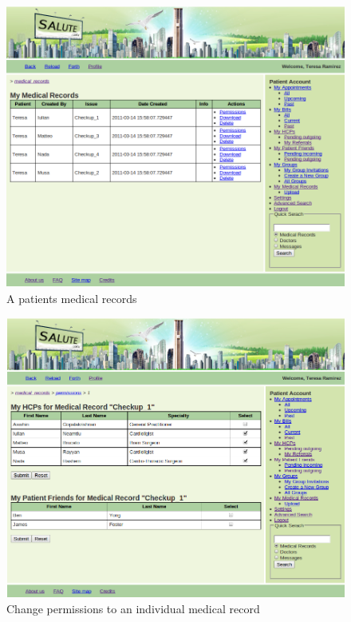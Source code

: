 \begin{figure}
\includegraphics[scale=0.5]{screenshots/my_medical_records.png}
\caption{A patients medical records}
\end{figure}

\begin{figure}
\includegraphics[scale=0.5]{screenshots/change_permissions_to_medical_rec.png}
\caption{Change permissions to an individual medical record}
\end{figure}

